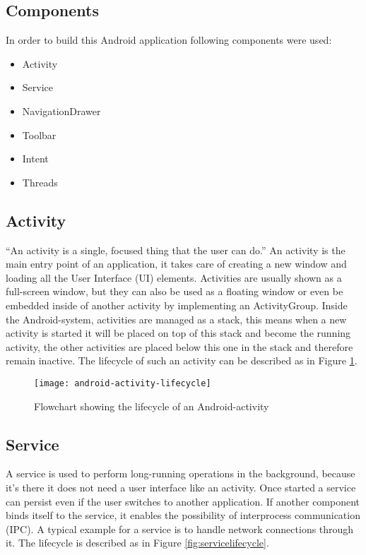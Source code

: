 \subsection{Components}
In order to build this Android application following components were used:

\begin{itemize}
	\item Activity
	\item Service
	\item NavigationDrawer
	\item Toolbar
	\item Intent
	\item Threads
\end{itemize}

\subsection{Activity}
``An activity is a single, focused thing that the user can do.'' \cite{AndroidActivity} An activity is the main entry point of an application, it takes care of creating a new window and loading all the User Interface (UI) elements. Activities are usually shown as a full-screen window, but they can also be used as a floating window or even be embedded inside of another activity by implementing an ActivityGroup. Inside the Android-system, activities are managed as a stack, this means when a new activity is started it will be placed on top of this stack and become the running activity, the other activities are placed below this one in the stack and therefore remain inactive. The lifecycle of such an activity can be described as in Figure \ref{fig:activitylifecycle}.

\begin{figure}[H]
	\centering
	\texttt{[image: android-activity-lifecycle]}
	\caption{Flowchart showing the lifecycle of an Android-activity}
	\label{fig:activitylifecycle}
\end{figure}

\subsection{Service}
A service is used to perform long-running operations in the background, because it's there it does not need a user interface like an activity. Once started a service can persist even if the user switches to another application. If another component binds itself to the service, it enables the possibility of interprocess communication (IPC). A typical example for a service is to handle network connections through it. The lifecycle is described as in Figure \ref{fig:servicelifecycle}.

